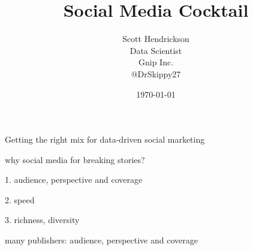 \documentclass{beamer}
\begin{document}
\title{Social Media Cocktail}  
\author{Scott Hendrickson \\ Data Scientist  \\ Gnip Inc.\\ @DrSkippy27}
\date{\today} 


\begin{frame}
\titlepage
\end{frame}


\begin{frame}
\begin{center}
{\Huge Getting the right mix for data-driven social marketing}
\end{center}
\end{frame}

\begin{frame}
\begin{center}
{\Huge why social media for breaking stories? }
\end{center}
\end{frame}


\begin{frame}
\begin{center}
{\Huge 1. audience, perspective and coverage }
\end{center}
\end{frame}

\begin{frame}
\begin{center}
{\Huge 2. speed }
\end{center}
\end{frame}

\begin{frame}
\begin{center}
{\Huge 3. richness, diversity }
\end{center}
\end{frame}


\begin{frame}
\begin{center}
{\Huge many publishers: audience, perspective and coverage }
\end{center}
\end{frame}

\end{document}
